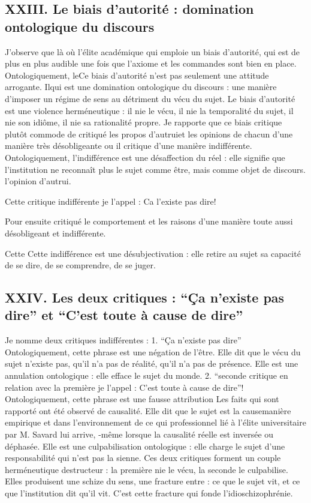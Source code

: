 \documentclass[12pt,a4paper]{article}
\begin{document}
\subsection*{XXIII. Le biais d’autorité : domination ontologique du discours}
J’observe que là où l’élite académique qui emploie un biais d’autorité,  qui est de plus en plus audible une fois que l’axiome et les commandes sont bien en place. Ontologiquement, leCe biais d’autorité n’est pas seulement une attitude arrogante. Ilqui est une domination ontologique du discours : une manière d’imposer un régime de sens au détriment du vécu du sujet.
Le biais d’autorité est une violence herméneutique : il nie le vécu, il nie la temporalité du sujet, il nie son idiôme, il nie sa rationalité propre.
Je rapporte que ce biais critique plutôt commode de critiqué les propos d’autruiet les opinions de chacun d’une manière très désobligeante ou il critique d’une manière indifférente. Ontologiquement, l’indifférence est une désaffection du réel : elle signifie que l’institution ne reconnaît plus le sujet comme être, mais comme objet de discours. l’opinion d’autrui.

Cette critique indifférente je l’appel : Ca l’existe pas dire!

Pour ensuite critiqué le comportement et les raisons d’une manière toute aussi désobligeant et indifférente.

Cette Cette indifférence est une désubjectivation : elle retire au sujet sa capacité de se dire, de se comprendre, de se juger.

\subsection*{XXIV. Les deux critiques : “Ça n’existe pas dire” et “C’est toute à cause de dire”}
Je nomme deux critiques indifférentes :
1. “Ça n’existe pas dire”
Ontologiquement, cette phrase est une négation de l’être. Elle dit que le vécu du sujet n’existe pas, qu’il n’a pas de réalité, qu’il n’a pas de présence. Elle est une annulation ontologique : elle efface le sujet du monde.
2. “seconde critique en relation avec la première je l’appel : C’est toute à cause de dire”!
Ontologiquement, cette phrase est une fausse attribution
Les faits qui sont rapporté ont été observé de causalité. Elle dit que le sujet est la causemanière empirique et dans l’environnement de ce qui professionnel lié à l’élite universitaire par M. Savard lui arrive, -même lorsque la causalité réelle est inversée ou déphasée. Elle est une culpabilisation ontologique : elle charge le sujet d’une responsabilité qui n’est pas la sienne.
Ces deux critiques forment un couple herméneutique destructeur : la première nie le vécu, la seconde le culpabilise.
Elles produisent une schize du sens, une fracture entre :
	ce que le sujet vit,
	et ce que l’institution dit qu’il vit.
C’est cette fracture qui fonde l’idioschizophrénie.
\end{document}

